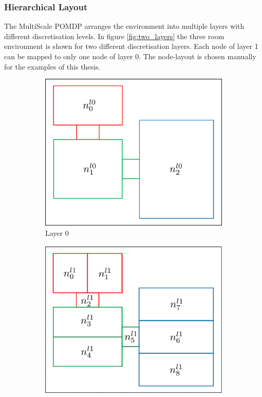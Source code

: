 \subsubsection{Hierarchical Layout}
The MultiScale POMDP arranges the environment into multiple layers with different discretisation levels. In figure \ref{fig:two_layers} the three room environment is shown for two different discretisation layers. Each node of layer 1 can be mapped to only one node of layer 0. The node-layout is chosen manually for the examples of this thesis. 
\begin{figure}
    \centering
    \begin{subfigure}[b]{0.48\textwidth}
        \includegraphics[width=\textwidth]{Report/images/layer0_b.png}
        \caption[t]{Layer 0}
        \label{subfig:l0}
    \end{subfigure}
    \hfill
    \begin{subfigure}[b]{0.48\textwidth}
        \includegraphics[width=\textwidth]{Report/images/layer1.png}

\end{subfigure}
\end{figure}

